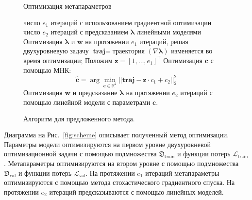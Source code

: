 \documentclass[12pt]{a&t}
\begin{document}
\begin{figure}

\begin{algorithm}[H]
\caption{Оптимизация метапараметров}
\begin{algorithmic}[1]

 \REQUIRE число $e_1$ итераций с использованием градиентной оптимизации
 \REQUIRE число $e_2$ итераций с предсказанием $\boldsymbol{\lambda}$ линейными моделями
  \STATE Оптимизация $\boldsymbol{\lambda}$ и $\mathbf{w}$ на протяжении $e_1$ итераций, решая двухуровневую задачу
  \STATE $\textbf{traj} = $траектория $(\nabla \boldsymbol{\lambda})$ изменяется во время оптимизации;
  \STATE Положим $\mathbf{z} = [1,\dots,e_1]^\mathsf{T}$
  \STATE Оптимизация $\mathbf{c}$ с помощью МНК: 
  $$\hat{\mathbf{c}} = \arg\min_{\mathbf{c} \in \mathbb{R}^2} ||\textbf{traj} - \mathbf{z}\cdot c_1 + c_2||_2^2$$
  \STATE Оптимизация $\mathbf{w}$ и предсказание $\boldsymbol{\lambda}$ на протяжении $e_2$ итераций с помощью линейной модели с параметрами $\mathbf{c}$.
  \ENDWHILE

 \end{algorithmic}
 \end{algorithm}
 
 \caption{Алгоритм для предложенного метода.}
 \label{algo}

 \end{figure}

Диаграмма на Рис.~\ref{fig:scheme} описывает полученный метод оптимизации. Параметры модели оптимизируются на первом уровне двухуровневой оптимизационной задачи с помощью подмножества $\mathfrak{D}_\text{train}$ и функции потерь $\mathcal{L}_{\text{train}}$. Метапараметры оптимизируются на втором уровне с помощью подмножества $\mathfrak{D}_\text{val}$ и функции потерь $\mathcal{L}_\text{val}$. На протяжении $e_1$ итераций метапараметры оптимизируются с помощью метода стохастического градиентного спуска. На протяжении $e_2$ итераций предсказываются с помощью линейных моделей.
\end{document}
